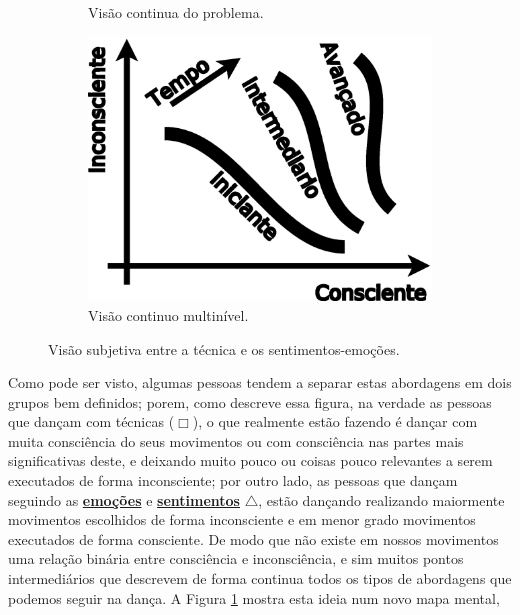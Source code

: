 \begin{figure}[ht]
\begin{subfigure}{.32\textwidth}
      \caption{Visão continua do problema.}
      \label{fig:tecniva-sentimento:b}
    \end{subfigure}
    \hfill
    \begin{subfigure}{.32\textwidth}
      \centering
      \includegraphics[width=.975\linewidth]{chapters/cap-musicalidade-tecnica/tecnica-emotion-3}  
      \caption{Visão continuo multinível.}
      \label{fig:tecniva-sentimento:c}
    \end{subfigure}
    \caption{Visão subjetiva entre a técnica e os sentimentos-emoções.}
    \label{fig:tecniva-sentimento}
\end{figure}
Como pode ser visto, algumas pessoas tendem a separar estas abordagens em dois grupos bem definidos;
porem, como descreve essa figura, na verdade as pessoas que dançam com técnicas ($\Box$),
o que realmente estão fazendo é dançar com muita consciência do seus movimentos
ou com consciência nas partes mais significativas deste,
e deixando muito pouco ou coisas pouco relevantes a serem executados de forma inconsciente;
por outro lado, as pessoas que dançam seguindo as \hyperref[subsec:emotion]{\textbf{emoções}} e 
\hyperref[subsec:filling]{\textbf{sentimentos}} $\bigtriangleup$,
estão dançando realizando maiormente movimentos escolhidos de forma inconsciente 
e em menor grado movimentos executados de forma consciente.
De modo que não existe em nossos movimentos uma relação binária entre consciência e inconsciência,
e sim muitos pontos intermediários que descrevem de forma continua
todos os tipos de abordagens que podemos seguir na dança.
A Figura \ref{fig:tecniva-sentimento:b} mostra esta ideia num novo mapa mental,

